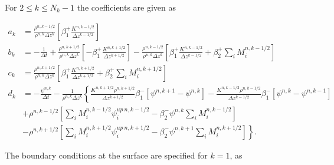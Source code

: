 \documentclass[dvipdfmx,a4paper,10pt]{article}
\begin{document}
\noindent For $2\leq k \leq N_k-1$ the coefficients are given as 

\begin{align*}
  a_k &=  \frac{\rho^{n,k-1/2}}{\rho^{n,k}\Delta z^k} \left[\beta_1^+ \frac{K^{n,k-1/2}}{\Delta z ^{k-1/2}}\right]\\
    b_k &= -\frac{1}{\Delta t} + \frac{\rho^{n,k+1/2}}{\rho^{n,k}\Delta z^k} \left[-\beta_1^+\frac{K^{n,k+1/2}}{\Delta z ^{k+1/2}} \right]-\frac{\rho^{n,k-1/2}}{\rho^{n,k}\Delta z^k} \left[\beta_1^+\frac{K^{n,k-1/2}}{\Delta z ^{k-1/2}}+\beta_2^+\sum_iM_i^{n,k-1/2} \right] \\
      c_k &= \frac{\rho^{n,k+1/2}}{\rho^{n,k}\Delta z^k}\left[\beta_1^+ \frac{K^{n,k+1/2}}{\Delta z ^{k+1/2}}+\beta_2^+\sum_iM_i^{n,k+1/2} \right] \\
      d_k &=-\frac{\psi^{n,k}}{\Delta t} - \frac{1}{\rho^{n,k}\Delta z^k} \left\{ \frac{K^{n,k+1/2}\rho^{n,k+1/2}}{\Delta z^{k+1/2}}\beta_1^{-}\left[\psi^{n,k+1} - \psi^{n,k}\right]-\frac{K^{n,k-1/2}\rho^{n,k-1/2}}{\Delta z^{k-1/2}}\beta_1^{-}\left[\psi^{n,k} - \psi^{n,k-1}\right]\right.   \\   
          & \left.+\rho^{n,k-1/2}\left[\sum_iM_i^{n,k-1/2}\psi_i^{up~n,k-1/2} - \beta_2^{-}\psi^{n,k}\sum_iM_i^{n,k-1/2} \right]\right.\\
          & \left. -\rho^{n,k+1/2}\left[\sum_iM_i^{n,k+1/2}\psi_i^{up~n,k+1/2} - \beta_2^{-}\psi^{n,k+1}\sum_iM_i^{n,k+1/2} \right] \right\}.
\end{align*}

\noindent The boundary conditions at the surface are specified for $k=1$, as
\end{document}
